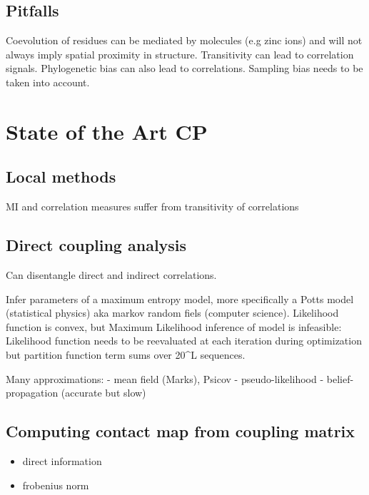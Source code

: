 \documentclass[12pt,a4paper,twoside]{book}
\providecommand{\tightlist}{%
  \setlength{\itemsep}{0pt}\setlength{\parskip}{0pt}}
\theoremstyle{definition}
\theoremstyle{definition}
\theoremstyle{remark}
\begin{document}
\subsection{Pitfalls}\label{pitfalls}

Coevolution of residues can be mediated by molecules (e.g zinc ions) and
will not always imply spatial proximity in structure. Transitivity can
lead to correlation signals. Phylogenetic bias can also lead to
correlations. Sampling bias needs to be taken into account.

\section{State of the Art CP}\label{state-of-the-art-cp}

\subsection{Local methods}\label{local-methods}

MI and correlation measures suffer from transitivity of correlations

\subsection{Direct coupling analysis}\label{direct-coupling-analysis}

Can disentangle direct and indirect correlations.

Infer parameters of a maximum entropy model, more specifically a Potts
model (statistical physics) aka markov random fiels (computer science).
Likelihood function is convex, but Maximum Likelihood inference of model
is infeasible: Likelihood function needs to be reevaluated at each
iteration during optimization but partition function term sums over
20\^{}L sequences.

Many approximations: - mean field (Marks), Psicov - pseudo-likelihood -
belief-propagation (accurate but slow)

\subsection{Computing contact map from coupling
matrix}\label{computing-contact-map-from-coupling-matrix}

\begin{itemize}
\tightlist
\item
  direct information
\item
  frobenius norm
\end{itemize}
\end{document}
